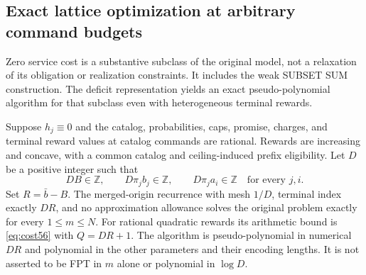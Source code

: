 \subsection{Exact lattice optimization at arbitrary command budgets}\label{sec:lattice56}
Zero service cost is a substantive subclass of the original model, not a relaxation of its obligation or realization constraints. It includes the weak SUBSET SUM construction. The deficit representation yields an exact pseudo-polynomial algorithm for that subclass even with heterogeneous terminal rewards.

\begin{theorem}\label{thm:lattice56}
Suppose $h_j\equiv0$ and the catalog, probabilities, caps, promise, charges, and terminal reward values at catalog commands are rational. Rewards are increasing and concave, with a common catalog and ceiling-induced prefix eligibility. Let $D$ be a positive integer such that
\begin{equation}\label{eq:latticeassumption56}
 DB\in\mathbb Z,\qquad D\pi_jb_j\in\mathbb Z,\qquad
 D\pi_ja_i\in\mathbb Z\quad\text{for every }j,i.
\end{equation}
Set $R=\bar b-B$. The merged-origin recurrence with mesh $1/D$, terminal index exactly $DR$, and no approximation allowance solves the original problem exactly for every $1\leq m\leq N$. For rational quadratic rewards its arithmetic bound is \eqref{eq:cost56} with $Q=DR+1$. The algorithm is pseudo-polynomial in numerical $DR$ and polynomial in the other parameters and their encoding lengths. It is not asserted to be FPT in $m$ alone or polynomial in $\log D$.
\end{theorem}
